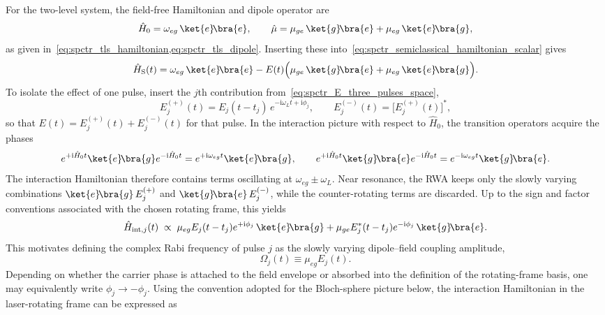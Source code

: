 For the two-level system, the field-free Hamiltonian and dipole operator are
\begin{equation*}
    \hat{H}_{0} = \omega_{eg}\,\ket{e}\!\bra{e},
    \qquad
    \hat{\mu}
    = \mu_{ge}\,\ket{g}\!\bra{e} + \mu_{eg}\,\ket{e}\!\bra{g},
\end{equation*}
as given in~\autoref{eq:spctr_tls_hamiltonian,eq:spctr_tls_dipole}. Inserting these into~\autoref{eq:spctr_semiclassical_hamiltonian_scalar} gives
\begin{equation*}
    \hat{H}_{\mathrm{S}}(t)
    = \omega_{eg}\,\ket{e}\!\bra{e}
    - E(t)\Big(\mu_{ge}\,\ket{g}\!\bra{e} + \mu_{eg}\,\ket{e}\!\bra{g}\Big).
\end{equation*}
To isolate the effect of one pulse, insert the $j$th contribution from~\autoref{eq:spctr_E_three_pulses_space},
\begin{equation*}
    E_j^{(+)}(t)
    = E_j(t-t_j)\,e^{-\mathrm{i}\omega_L t + \mathrm{i}\phi_j},
    \qquad
    E_j^{(-)}(t)=\bigl[E_j^{(+)}(t)\bigr]^*,
\end{equation*}
so that $E(t)=E_j^{(+)}(t)+E_j^{(-)}(t)$ for that pulse. In the interaction picture with respect to $\hat{H}_{0}$, the transition operators acquire the phases
\begin{equation*}
    e^{+\mathrm{i}\hat{H}_0 t}\ket{e}\!\bra{g}e^{-\mathrm{i}\hat{H}_0 t}=e^{+\mathrm{i}\omega_{eg}t}\ket{e}\!\bra{g},
    \qquad
    e^{+\mathrm{i}\hat{H}_0 t}\ket{g}\!\bra{e}e^{-\mathrm{i}\hat{H}_0 t}=e^{-\mathrm{i}\omega_{eg}t}\ket{g}\!\bra{e}.
\end{equation*}
The interaction Hamiltonian therefore contains terms oscillating at $\omega_{eg}\pm\omega_L$. Near resonance, the RWA keeps only the slowly varying combinations $\ket{e}\!\bra{g}\,E_j^{(+)}$ and $\ket{g}\!\bra{e}\,E_j^{(-)}$, while the counter-rotating terms are discarded. Up to the sign and factor conventions associated with the chosen rotating frame, this yields
\begin{equation*}
    \hat{H}_{\mathrm{int},j}(t)
    \;\propto\;
    \mu_{eg}E_j(t-t_j)e^{+\mathrm{i}\phi_j}\,\ket{e}\!\bra{g}
    + \mu_{ge}E_j^*(t-t_j)e^{-\mathrm{i}\phi_j}\,\ket{g}\!\bra{e}.
\end{equation*}
This motivates defining the complex Rabi frequency of pulse $j$ as the slowly varying dipole--field coupling amplitude,
\begin{equation*}
    \Omega_j(t) \equiv \mu_{eg}E_j(t).
\end{equation*}
Depending on whether the carrier phase is attached to the field envelope or absorbed into the definition of the rotating-frame basis, one may equivalently write $\phi_j\to -\phi_j$. Using the convention adopted for the Bloch-sphere picture below, the interaction Hamiltonian in the laser-rotating frame can be expressed as
